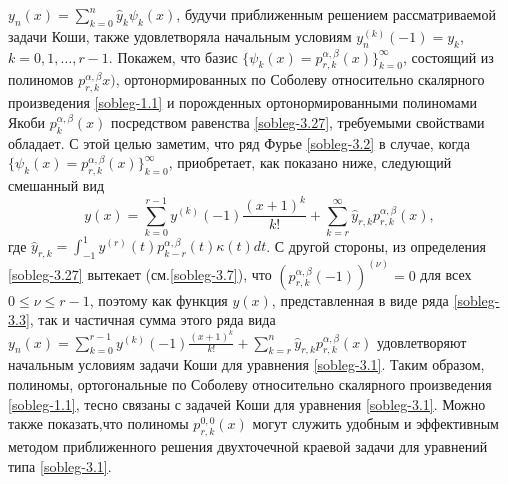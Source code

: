 $ y_n(x)=\sum_{k=0}^n\hat y_k\psi_k(x)$, будучи приближенным решением рассматриваемой задачи Коши, также удовлетворяла  начальным условиям $y_n^{(k)}(-1)=y_k$, $k=0,1,\ldots,r-1$. Покажем, что  базис $\{\psi_k(x)=p_{r,k}^{\alpha,\beta}(x)\}_{k=0}^\infty$, состоящий из полиномов
$p_{r,k}^{\alpha,\beta}x)$, ортонормированных по Соболеву относительно скалярного произведения \eqref{sobleg-1.1} и порожденных ортонормированными полиномами Якоби $p_k^{\alpha,\beta}(x)$  посредством равенства \eqref{sobleg-3.27}, требуемыми свойствами обладает.
   С этой целью заметим, что ряд Фурье \eqref{sobleg-3.2} в случае, когда $\{\psi_k(x)=p_{r,k}^{\alpha,\beta}(x)\}_{k=0}^\infty$, приобретает, как показано ниже, следующий смешанный вид
   \begin{equation}\label{sobleg-3.3}
y(x)= \sum_{k=0}^{r-1} y^{(k)}(-1)\frac{(x+1)^k}{k!}+ \sum_{k=r}^\infty \hat y_{r,k}p_{r,k}^{\alpha,\beta}(x),
\end{equation}
где  $ \hat y_{r,k}=\int_{-1}^1 y^{(r)}(t)p_{k-r}^{\alpha,\beta}(t)\kappa(t)dt$.
С другой стороны, из определения \eqref{sobleg-3.27} вытекает (см.\eqref{sobleg-3.7}), что $(p_{r,k}^{\alpha,\beta}(-1))^{(\nu)}=0$ для всех $0\le\nu\le r-1$, поэтому как функция $y(x)$, представленная в виде ряда \eqref{sobleg-3.3}, так и частичная  сумма этого ряда вида
$
y_n(x)= \sum_{k=0}^{r-1} y^{(k)}(-1)\frac{(x+1)^k}{k!}+ \sum_{k=r}^n \hat y_{r,k}p_{r,k}^{\alpha,\beta}(x)
$
удовлетворяют начальным условиям задачи Коши для уравнения \eqref{sobleg-3.1}.
Таким образом, полиномы, ортогональные по Соболеву относительно скалярного произведения \eqref{sobleg-1.1}, тесно связаны с задачей Коши для уравнения \eqref{sobleg-3.1}. Можно также показать,что полиномы $p_{r,k}^{0,0}(x)$ могут служить удобным и эффективным методом приближенного решения двухточечной краевой задачи для уравнений типа \eqref{sobleg-3.1}.





